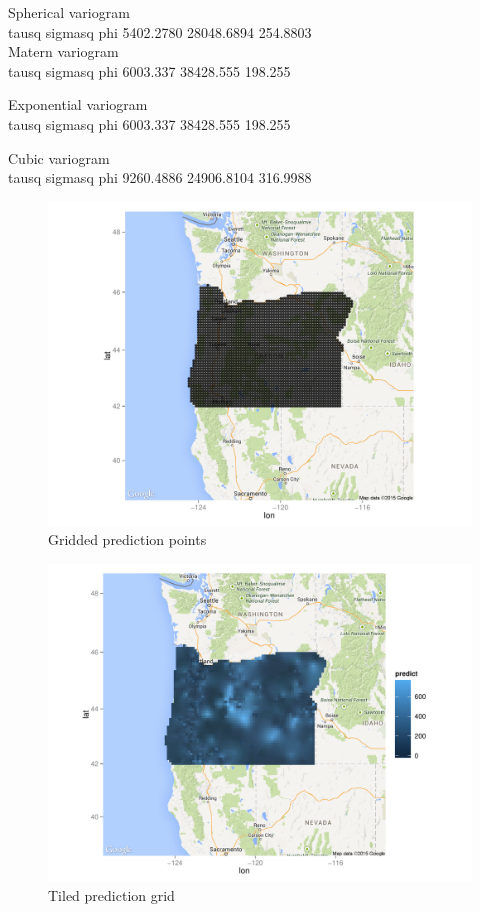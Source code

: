 \documentclass[12pt,twoside]{reedthesis}
\begin{document}
Spherical variogram\\
tausq    sigmasq        phi 
 5402.2780 28048.6894   254.8803 \\
 
 Matern variogram \\
 tausq   sigmasq       phi 
 6003.337 38428.555   198.255 
 
 Exponential variogram \\
 tausq   sigmasq       phi 
 6003.337 38428.555   198.255 
 
 Cubic variogram \\
 tausq    sigmasq        phi 
 9260.4886 24906.8104   316.9988 
 
 \begin{figure}[h!]
	   
	       \centering
	  
	    \includegraphics[scale=0.7]{pred_points}
	
	     \caption{Gridded prediction points}
	 \label{grid}
	\end{figure}
 
\begin{figure}[h!]
	   
	       \centering
	  
	    \includegraphics[scale=0.7]{tileplot}
	
	     \caption{Tiled prediction grid}
	 \label{tile}
	\end{figure}
	
\end{document}
